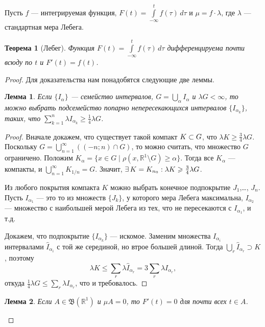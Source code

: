 \documentclass[12pt,titlepage]{article}
\newcounter{tema}
\newtheorem{theorem}{Теорема}[tema]
\newtheorem{lemm}{Лемма}[tema]
\theoremstyle{definition}
\newcommand*{\p}[1]{#1\nobreak\discretionary{}{\hbox{$\mathsurround=0pt #1$}}{}}
\begin{document}
Пусть $f$ --- интегрируемая функция,
$F(t)=\int\limits_{-\infty}^t\!f(\tau)\,d\tau$ и
$\mu=f\cdot\lambda$, где $\lambda$ --- стандартная мера Лебега.

\begin{theorem}[Лебег]
Функция $F(t)=\int\limits_{-\infty}^t\!f(\tau)\,d\tau$
дифференцируема почти всюду по $t$ и $F'(t)=f(t)$.
\end{theorem}

\begin{proof}

Для доказательства нам понадобятся следующие две леммы.

\begin{lemm}\label{lemm1}
Если $\{I_\alpha\}$ --- семейство интервалов,
$G=\bigcup\limits_\alpha I_\alpha$ и $\lambda G<\infty$, то можно
выбрать подсемейство попарно непересекающихся интервалов
$\{I_{\alpha_k}\}$, таких, что $\sum\limits_{k=1}^n\lambda
I_{\alpha_k}\geqslant \frac 1 4 \lambda G$.
\end{lemm}

\begin{proof}
Вначале докажем, что существует такой компакт $K\p\subset G$, что
$\lambda K\geqslant\frac 3 4\lambda G$. Поскольку
$G=\bigcup\limits_{n=1}^\infty((-n;n)\cap G)$, то можно считать, что
множество $G$ ограничено. Положим $K_\alpha=\{x\in G\mid
\rho(x,\mathbb{R}^1\setminus G)\geqslant\alpha\}$. Тогда все
$K_\alpha$ --- компакты, и $\bigcup\limits_{n=1}^\infty K_{1/n}=G$.
Значит, $\exists\,K=K_{n_0}:\lambda K\p\geqslant\frac 3 4\lambda G$.

Из любого покрытия компакта $K$ можно выбрать конечное подпокрытие
$J_1$,\ldots, $J_n$. Пусть $I_{\alpha_1}$ --- это то из множеств
$\{J_k\}$, у которого мера Лебега максимальна, $I_{\alpha_2}$ ---
множество с наибольшей мерой Лебега из тех, что не пересекаются с
$I_{\alpha_1}$, и т.д.

Докажем, что подпокрытие $\{I_{\alpha_k}\}$ --- искомое. Заменим
множества $I_{\alpha_i}$ интервалами $\hat{I}_{\alpha_i}$ с той же
серединой, но втрое большей длиной. Тогда $\bigcup\limits_r
\hat{I}_{\alpha_r}\supset K$, поэтому $$\lambda
K\leqslant\sum\limits_r\lambda
\hat{I}_{\alpha_r}=3\sum\limits_r\lambda I_{\alpha_r},$$ откуда
$\frac 1 4\lambda G\leqslant\sum\limits_r\lambda I_{\alpha_r}$, что
и требовалось.
\end{proof}

\begin{lemm}\label{lemm2}
Если $A\in\mathfrak{B}(\mathbb{R}^1)$ и $\mu A=0$, то $F'(t)=0$ для
почти всех $t\in A$.
\end{lemm}


\end{proof}
\end{document}
